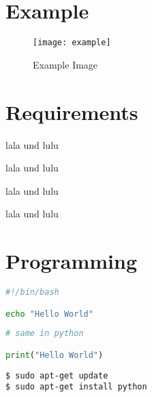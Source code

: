 \section{Example}

\begin{figure}[H]
    \begin{center} 
        \texttt{[image: example]}
        \caption{Example Image}
        \label{fig:example}
    \end{center}
\end{figure}

\cite[vgl. dazu][]{example-book}

\cite[vgl. dazu][]{example-online}

\newpage

\section{Requirements}

lala und lulu

lala und lulu

lala und lulu

lala und lulu

\section{Programming}

\begin{lstlisting}[language=Bash]
#!/bin/bash

echo "Hello World"
\end{lstlisting}

\begin{lstlisting}[language=Python]
# same in python

print("Hello World")
\end{lstlisting}

\begin{verbatim}
$ sudo apt-get update
$ sudo apt-get install python
\end{verbatim}
